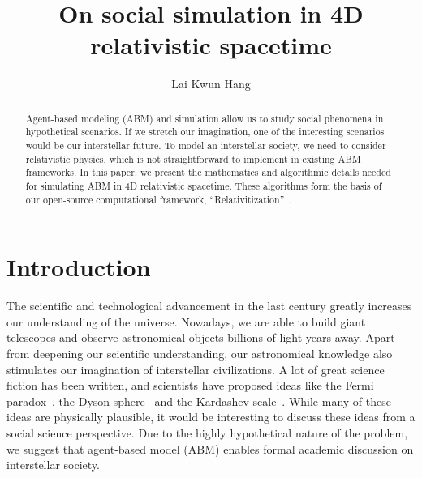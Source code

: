 \documentclass{svproc}
\begin{document}
\mainmatter              %
%
\title{On social simulation in 4D relativistic spacetime}
%
%
\author{Lai Kwun Hang}
%
%
%

\maketitle              %

\begin{abstract}
Agent-based modeling (ABM) and simulation allow us to study social phenomena in hypothetical scenarios.
If we stretch our imagination, one of the interesting scenarios would be our interstellar future.
To model an interstellar society, we need to consider relativistic physics,
which is not straightforward to implement in existing ABM frameworks.
In this paper, we present the mathematics and algorithmic details needed for simulating ABM in 4D relativistic spacetime.
These algorithms form the basis of our open-source computational framework, ``Relativitization''~\cite{relativitization}.
\end{abstract}

\section{Introduction}
The scientific and technological advancement in the last century greatly increases our understanding of the universe.
Nowadays, we are able to build giant telescopes and observe astronomical objects billions of light years away.
Apart from deepening our scientific understanding, our astronomical knowledge also stimulates our imagination
of interstellar civilizations.
A lot of great science fiction has been written, and scientists have proposed ideas like 
the Fermi paradox~\cite{gray2015fermi}, the Dyson sphere~\cite{wright2020dyson} and the Kardashev scale~\cite{gray2020extended}.
While many of these ideas are physically plausible, 
it would be interesting to discuss these ideas from a social science perspective.
Due to the highly hypothetical nature of the problem,
we suggest that agent-based model (ABM) enables formal academic discussion on interstellar society.
\end{document}
